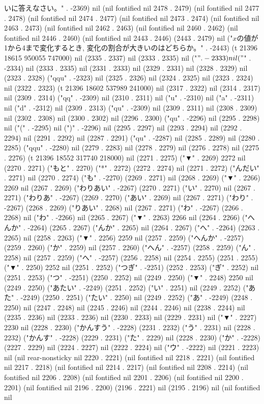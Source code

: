 いに答えなさい。" . -2369) nil (nil fontified nil 2478 . 2479) (nil fontified nil 2477 . 2478) (nil fontified nil 2474 . 2477) (nil fontified nil 2473 . 2474) (nil fontified nil 2463 . 2473) (nil fontified nil 2462 . 2463) (nil fontified nil 2460 . 2462) (nil fontified nil 2446 . 2460) (nil fontified nil 2443 . 2446) (2443 . 2479) nil ("$x$の値が1から4まで変化するとき, 変化の割合が大きいのはどちらか。" . -2443) (t 21396 18615 950055 747000) nil (2335 . 2337) nil (2333 . 2335) nil ("$" . -2333) nil ("$" . -2334) nil (2333 . 2335) nil (2331 . 2333) nil (2329 . 2331) nil (2328 . 2329) nil (2323 . 2328) ("qqu" . -2323) nil (2325 . 2326) nil (2324 . 2325) nil (2323 . 2324) nil (2322 . 2323) (t 21396 18602 537989 241000) nil (2317 . 2322) nil (2314 . 2317) nil (2309 . 2314) ("qq" . -2309) nil (2310 . 2311) nil ("u" . -2310) nil ("a" . -2311) nil ("d" . -2312) nil (2309 . 2313) ("qu" . -2309) nil (2309 . 2311) nil (2308 . 2309) nil (2302 . 2308) nil (2300 . 2302) nil (2296 . 2300) ("qu" . -2296) nil (2295 . 2298) nil ("(" . -2295) nil (")" . -2296) nil (2295 . 2297) nil (2293 . 2294) nil (2292 . 2294) nil (2291 . 2292) nil (2287 . 2291) ("qu" . -2287) nil (2285 . 2289) nil (2280 . 2285) ("qqu" . -2280) nil (2279 . 2283) nil (2278 . 2279) nil (2276 . 2278) nil (2275 . 2276) (t 21396 18552 317740 218000) nil (2271 . 2275) ("▼" . 2269) 2272 nil (2270 . 2271) ("もと" . 2270) ("*" . 2272) (2272 . 2274) nil (2271 . 2272) ("んだい" . 2271) nil (2270 . 2274) ("も" . -2270) (2269 . 2271) nil (2268 . 2269) ("▼" . 2266) 2269 nil (2267 . 2269) ("わりあい" . -2267) (2270 . 2271) ("い" . 2270) nil (2267 . 2271) ("わりあ" . -2267) (2269 . 2270) ("あい" . 2269) nil (2267 . 2271) ("わり" . -2267) (2268 . 2269) ("りあい" . 2268) nil (2267 . 2271) ("わ" . -2267) (2266 . 2268) nil ("わ" . -2266) nil (2265 . 2267) ("▼" . 2263) 2266 nil (2264 . 2266) ("へんか" . -2264) (2265 . 2267) ("んか" . 2265) nil (2264 . 2267) ("へ" . -2264) (2263 . 2265) nil (2258 . 2263) ("▼" . 2256) 2259 nil (2257 . 2259) ("へんか" . -2257) (2259 . 2260) ("か" . 2259) nil (2257 . 2260) ("へん" . -2257) (2258 . 2259) ("ん" . 2258) nil (2257 . 2259) ("へ" . -2257) (2256 . 2258) nil (2254 . 2255) (2251 . 2255) ("▼" . 2250) 2252 nil (2251 . 2252) ("つぎ" . -2251) (2252 . 2253) ("ぎ" . 2252) nil (2251 . 2253) ("つ" . -2251) (2250 . 2252) nil (2249 . 2250) ("▼" . 2248) 2250 nil (2249 . 2250) ("あたい" . -2249) (2251 . 2252) ("い" . 2251) nil (2249 . 2252) ("あた" . -2249) (2250 . 2251) ("たい" . 2250) nil (2249 . 2252) ("あ" . -2249) (2248 . 2250) nil (2247 . 2248) nil (2245 . 2246) nil (2244 . 2246) nil (2238 . 2244) nil (2235 . 2236) nil (2233 . 2236) nil (2230 . 2233) nil (2229 . 2231) nil ("▼" . 2227) 2230 nil (2228 . 2230) ("かんすう" . -2228) (2231 . 2232) ("う" . 2231) nil (2228 . 2232) ("かんす" . -2228) (2229 . 2231) ("た" . 2229) nil (2228 . 2230) ("か" . -2228) (2227 . 2229) nil (2224 . 2227) nil (2222 . 2224) nil ("ウ" . -2222) nil (2221 . 2223) nil (nil rear-nonsticky nil 2220 . 2221) (nil fontified nil 2218 . 2221) (nil fontified nil 2217 . 2218) (nil fontified nil 2214 . 2217) (nil fontified nil 2208 . 2214) (nil fontified nil 2206 . 2208) (nil fontified nil 2201 . 2206) (nil fontified nil 2200 . 2201) (nil fontified nil 2196 . 2200) (2196 . 2221) nil (2195 . 2196) nil (nil fontified nil 